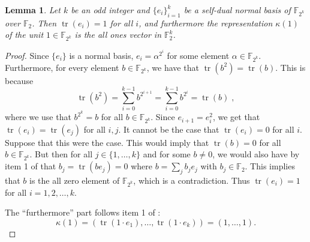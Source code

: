 \documentclass[11pt]{article}
\newtheorem{lemma}[theorem]{Lemma}
\theoremstyle{definition}
\newcommand{\F}{\ensuremath{\mathbb{F}}}
\newcommand{\downsize}{\kappa}
\DeclareMathOperator{\tr}{tr}
\begin{document}
\begin{lemma}
  \label{lem:one}
  Let $k$ be an odd integer and $\{e_i\}_{i=1}^k$ be a self-dual normal basis of
  $\F_{2^k}$ over $\F_2$.
  Then $\tr(e_i) = 1$ for all $i$, and furthermore the representation
  $\downsize(1)$ of the unit $1 \in \F_{2^k}$ is the all ones vector in
  $\F_2^k$.
\end{lemma}

\begin{proof}
  Since $\{e_i \}$ is a normal basis, $e_i = \alpha^{2^i}$ for some element
  $\alpha \in \F_{2^k}$.
  Furthermore, for every element $b \in \F_{2^k}$, we have that $\tr(b^2) =
  \tr(b)$.
  This is because
  \[
    \tr(b^2) = \sum_{i=0}^{k-1} b^{2^{i+1}} =
    \sum_{i = 0}^{k-1} b^{2^i} = \tr(b)\;,
  \]
  where we use that $b^{2^k} = b$ for all $b \in \F_{2^k}$.
  Since $e_{i+1} = e_i^2$, we get that $\tr(e_i) = \tr(e_j)$ for all $i,j$.
  It cannot be the case that $\tr(e_i) = 0$ for all $i$.
  Suppose that this were the case.
  This would imply that $\tr(b) = 0$ for all $b \in \F_{2^k}$.
  But then for all $j \in \{1, \ldots, k\}$ and for some $b \neq 0$, we would
  also have by item 1 of  that $b_j = \tr(b e_j) = 0$ where $b = \sum_j b_j e_j$ with $b_j \in
  \F_2$.
  This implies that $b$ is the all zero element of $\F_{2^k}$, which is a
  contradiction.
  Thus $\tr(e_i) = 1$ for all $i=1, 2, \ldots, k$.

	The ``furthermore'' part follows item 1 of
        :
        \begin{equation*}
          \downsize(1) = (\tr(1 \cdot e_1), \dots, \tr(1 \cdot e_k))
          = (1, \dots, 1).
        \end{equation*}
\end{proof}
\end{document}
